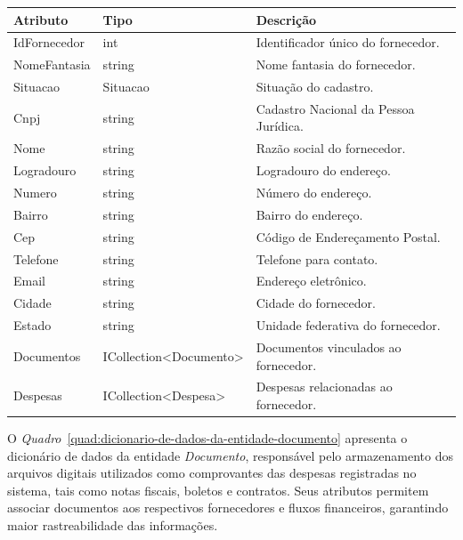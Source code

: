 \begin{quadro}[H]
\caption[Dicionário de dados da entidade Fornecedor]{Dicionário de dados da entidade Fornecedor}
\label{quad:dicionario-de-dados-da-entidade-fornecedor}

\begin{tabular}{|p{}|p{}|p{}|}
\hline
\textbf{Atributo} & \textbf{Tipo} & \textbf{Descrição} \\ 
\hline
IdFornecedor & int & Identificador único do fornecedor. \\ 
\hline
NomeFantasia & string & Nome fantasia do fornecedor. \\ 
\hline
Situacao & Situacao & Situação do cadastro. \\ 
\hline
Cnpj & string & Cadastro Nacional da Pessoa Jurídica. \\ 
\hline
Nome & string & Razão social do fornecedor. \\ 
\hline
Logradouro & string & Logradouro do endereço. \\ 
\hline
Numero & string & Número do endereço. \\ 
\hline
Bairro & string & Bairro do endereço. \\ 
\hline
Cep & string & Código de Endereçamento Postal. \\ 
\hline
Telefone & string & Telefone para contato. \\ 
\hline
Email & string & Endereço eletrônico. \\ 
\hline
Cidade & string & Cidade do fornecedor. \\ 
\hline
Estado & string & Unidade federativa do fornecedor. \\ 
\hline
Documentos & ICollection<Documento> & Documentos vinculados ao fornecedor. \\ 
\hline
Despesas & ICollection<Despesa> & Despesas relacionadas ao fornecedor. \\ 
\hline
\end{tabular}


\end{quadro}


O \textit{Quadro}~\ref{quad:dicionario-de-dados-da-entidade-documento} apresenta o dicionário de dados da entidade \textit{Documento}, responsável pelo armazenamento dos arquivos digitais utilizados como comprovantes das despesas registradas no sistema, tais como notas fiscais, boletos e contratos. Seus atributos permitem associar documentos aos respectivos fornecedores e fluxos financeiros, garantindo maior rastreabilidade das informações.

